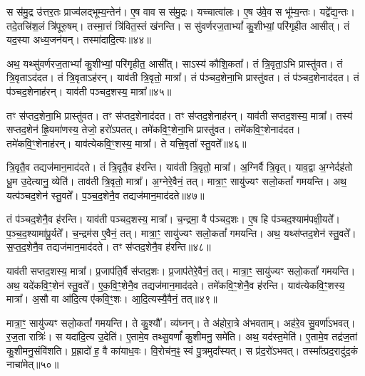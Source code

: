 स स॑मु॒द्र उ॑त्तर॒तः प्राज्व॑लद्भूम्य॒न्तेन॑।
ए॒ष वाव स स॑मु॒द्रः।
यच्चात्वा॑लः।
ए॒ष उ॑वे॒व स भू᳚म्य॒न्तः।
यद्वे᳚द्य॒न्तः।
तदे॒तत्त्रि॑श॒लं त्रि॑पूरु॒षम्।
तस्मा॒त्तं त्रि॑वित॒स्तं ख॑नन्ति।
स सु॑वर्णरज॒ताभ्यां᳚ कु॒शीभ्यां॒ परि॑गृहीत आसीत्।
तं यद॒स्या अध्य॒जन॑यन्।
तस्मा॑दादि॒त्यः॥४४॥\ip

अथ॒ यथ्सु॑वर्णरज॒ताभ्यां᳚ कु॒शीभ्यां॒ परि॑गृहीत॒ आसी᳚त्।
साऽस्य॑ कौशि॒कता᳚।
तं त्रि॒वृता॒ऽभि प्रास्तु॑वत।
तं त्रि॒वृता\-ऽद॑दत।
तं त्रि॒वृता\-ऽह॑रन्।
याव॑ती त्रि॒वृतो॒ मात्रा᳚।
तं प॑ञ्चद॒शेना॒भि प्रास्तु॑वत।
तं प॑ञ्चद॒शेनाद॑दत।
तं प॑ञ्चद॒शेनाह॑रन्।
याव॑ती पञ्चद॒शस्य॒ मात्रा᳚॥४५॥\ip

तꣳ स॑प्तद॒शेना॒भि प्रास्तु॑वत।
तꣳ स॑प्तद॒शेनाद॑दत।
तꣳ स॑प्तद॒शेनाह॑रन्।
याव॑ती सप्तद॒शस्य॒ मात्रा᳚।
तस्य॑ सप्तद॒शेन॑ ह्रि॒यमा॑णस्य॒ तेजो॒ हरो॑\-ऽपतत्।
तमे॑कवि॒ꣳ॒शेना॒भि प्रास्तु॑वत।
तमे॑कवि॒ꣳ॒शेनाद॑दत।
तमे॑कवि॒ꣳ॒शेनाह॑रन्।
याव॑त्येकवि॒ꣳ॒शस्य॒ मात्रा᳚।
ते यत्त्रि॒वृता᳚ स्तु॒वते᳚॥४६॥\ip

त्रि॒वृतै॒व तद्यज॑मान॒माद॑दते।
तं त्रि॒वृतै॒व ह॑रन्ति।
याव॑ती त्रि॒वृतो॒ मात्रा᳚।
अ॒ग्निर्वै त्रि॒वृत्।
याव॒द्वा अ॒ग्नेर्दह॑तो धू॒म उ॒देत्यानु॒ व्येति॑।
ताव॑ती त्रि॒वृतो॒ मात्रा᳚।
अ॒ग्नेरे॒वैनं॒ तत्।
मात्रा॒ꣳ॒ सायु॑ज्यꣳ सलो॒कतां᳚ गमयन्ति।
अथ॒ यत्प॑ञ्चद॒शेन॑ स्तु॒वते᳚।
प॒ञ्च॒द॒शेनै॒व तद्यज॑मान॒माद॑दते॥४७॥\ip

तं प॑ञ्चद॒शेनै॒व ह॑रन्ति।
याव॑ती पञ्चद॒शस्य॒ मात्रा᳚।
च॒न्द्रमा॒ वै प॑ञ्चद॒शः।
ए॒ष हि प॑ञ्चद॒श्याम॑पक्षी॒यते᳚।
प॒ञ्च॒द॒श्यामा॑पू॒र्यते᳚।
च॒न्द्रम॑स ए॒वैनं॒ तत्।
मात्रा॒ꣳ॒ सायु॑ज्यꣳ सलो॒कतां᳚ गमयन्ति।
अथ॒ यथ्स॑प्तद॒शेन॑ स्तु॒वते᳚।
स॒प्त॒द॒शेनै॒व तद्यज॑मान॒माद॑दते।
तꣳ स॑प्तद॒शेनै॒व ह॑रन्ति॥४८॥\ip

याव॑ती सप्तद॒शस्य॒ मात्रा᳚।
प्र॒जा\-प॑ति॒र्वै स॑प्तद॒शः।
प्र॒जा\-प॑तेरे॒वैनं॒ तत्।
मात्रा॒ꣳ॒ सायु॑ज्यꣳ सलो॒कतां᳚ गमयन्ति।
अथ॒ यदे॑कवि॒ꣳ॒शेन॑ स्तु॒वते᳚।
ए॒क॒वि॒ꣳ॒शेनै॒व तद्यज॑मान॒माद॑दते।
तमे॑कवि॒ꣳ॒शेनै॒व ह॑रन्ति।
याव॑त्येक\-वि॒ꣳ॒शस्य॒ मात्रा᳚।
अ॒सौ वा आ॑दि॒त्य ए॑कवि॒ꣳ॒शः।
आ॒दि॒त्यस्यै॒वैनं॒ तत्॥४९॥\ip

मात्रा॒ꣳ॒ सायु॑ज्यꣳ सलो॒कतां᳚ गमयन्ति।
ते कु॒श्यौ᳚।
व्य॑घ्नन्।
ते अ॑होरा॒त्रे अ॑भवताम्।
अह॑रे॒व सु॒वर्णा॑\-ऽभवत्।
र॒ज॒ता रात्रिः॑।
स यदा॑दि॒त्य उ॒देति॑।
ए॒तामे॒व तथ्सु॒वर्णां᳚ कु॒शीमनु॒ समे॑ति।
अथ॒ यद॑स्त॒मेति॑।
ए॒तामे॒व तद्र॑ज॒तां कु॒शीमनु॒संवि॑शति।
प्र॒ह्रादो॑ ह॒ वै का॑याध॒वः।
वि॒रोच॑न॒ꣴ॒ स्वं पु॒त्रमुदा᳚स्यत्।
स प्र॑द॒रो॑\-ऽभवत्।
तस्मा᳚त्प्रद॒रादु॑द॒कं नाचा॑मेत्॥५०॥\ip\anuvakamend[आ॒दि॒त्यः प॑ञ्चद॒शस्य॒ मात्रा᳚ स्तु॒वते॑ पञ्चद॒शेनै॒व तद्यज॑मान॒माद॑दते सप्तद॒शेनै॒व ह॑रन्त्यादि॒त्यस्यै॒वैनं॒ तद्वि॑शति च॒त्वारि॑ च]

